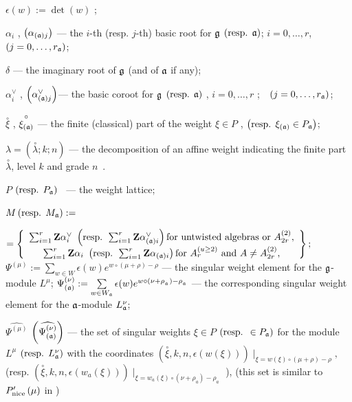 \documentclass[a4paper,12pt]{article}
\theoremstyle{definition} \newtheorem{Def}{Definition}
\newcommand{\co}[1]{\overset{\circ }{#1}}
\begin{document}
$\epsilon \left( w\right) :=\det \left( w\right) $ ;

$\alpha _{i}$ , $\left( \alpha _{\left( \frak{a}\right) j}\right) $ --- the $i
$-th (resp. $j$-th) basic root for $\frak{g}$ $\left( \text{resp. }\frak{a}%
\right) $; $i=0,\ldots ,r$,\ \ $\left( j=0,\ldots ,r_{\frak{a}}\right) $;

$\delta $ --- the imaginary root of $\frak{g}$ (and of $\frak{a}$ if any);

$\alpha _{i}^{\vee }$ , $\left( \alpha _{\left( \frak{a}\right) j}^{\vee
}\right) $--- the basic coroot for $\frak{g}$ $\left( \text{resp. }\frak{a}%
\right) $ , $i=0,\ldots ,r$ ;\ \ $\left( j=0,\ldots ,r_{\frak{a}}\right) $;

$\co{\xi }$ , $\co{\xi _{\left( \frak{a}\right) }}$
--- the finite (classical) part of the weight $\xi \in P$ , $\left( \text{%
resp. }\xi _{\left( \frak{a}\right) }\in P_{\frak{a}}\right) $;

$\lambda =\left( \co{\lambda };k;n\right) $ --- the
decomposition of an affine weight indicating the finite part $\co{\lambda }$, level $k$ and grade $n$\ .

$P$ $\left( \text{resp. } P_{\frak{a}}\right) $ \ --- the weight lattice;

$M \left( \text{resp. }M_{\frak{a}}\right) :=$

\noindent $=\left\{
\begin{array}{c}
\sum_{i=1}^{r}\mathbf{Z}\alpha _{i}^{\vee }\text{ }\left( \text{resp. }%
\sum_{i=1}^{r}\mathbf{Z}\alpha _{\left( \frak{a}\right) i}^{\vee }\right)
\text{for untwisted algebras or }A_{2r}^{\left( 2\right) }, \\
\sum_{i=1}^{r}\mathbf{Z}\alpha _{i}\text{ }\left( \text{resp. }\sum_{i=1}^{r}%
\mathbf{Z}\alpha _{\left( \frak{a}\right) i}\right) \text{for }A_{r}^{\left(
u\geq 2\right) }\text{ and }A\neq A_{2r}^{\left( 2\right) },
\end{array}
\right\} ;$\\
$\Psi ^{\left( \mu \right) }:=\sum\limits_{w\in W}\epsilon (w)e^{w\circ (\mu +\rho )-\rho }$ --- the singular weight element for the $\frak{g}$-module $L^{\mu }$;
$\Psi _{\left( \frak{a}\right) }^{\left( \nu \right) }:=\sum\limits_{w\in W_{\frak{a}}}\epsilon (w)e^{w\circ (\nu +\rho
_{_{\frak{a}}})-\rho _{_{\frak{a}}}}$ --- the corresponding singular weight
element for the $\frak{a}$-module $L_{\frak{a}}^{\nu }$;

$\widehat{\Psi ^{\left( \mu \right) }}$ $\left( \widehat{\Psi _{\left( \frak{%
a}\right) }^{\left( \nu \right) }}\right) $ --- the set of singular weights $%
\xi \in P$ $\left( \text{resp. }\in P_{\frak{a}}\right) $ for the module $%
L^{\mu }$ $\left( \text{resp. }L_{\frak{a}}^{\nu }\right) $ with the
coordinates $\left( \co{\xi },k,n,\epsilon \left( w\left( \xi
\right) \right) \right) \mid _{\xi =w\left( \xi \right) \circ (\mu +\rho
)-\rho },$ (resp. $\left( \co{\xi },k,n,\epsilon \left(
w_{a}\left( \xi \right) \right) \right) \mid _{\xi =w_{a}\left( \xi \right)
\circ (\nu +\rho _{a})-\rho _{a}}$ ), (this set is similar to $P_{\mathrm{%
nice}}^{\prime }\left( \mu \right) $ in \cite{wakimoto2001idl})
\end{document}
